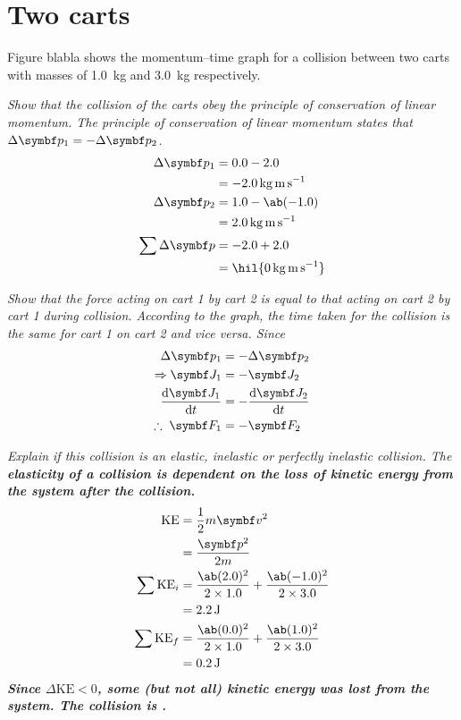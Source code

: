 \section{Two carts}
Figure blabla shows the momentum--time graph for a collision between
two carts with masses of \qty{1.0}{\kg}
and \qty{3.0}{\kg} respectively.

\it{Show that the collision of the carts obey the principle of
conservation of linear momentum.}
The principle of conservation of linear momentum states that
\(\Delta\mv{p}_1 = -\Delta\mv{p}_2\).
\begin{align*}
  \Delta\mv{p}_1 &= 0.0 - 2.0 \\
  &= \qty{-2.0}{\kg\m\per\second} \\
  \Delta\mv{p}_2 &= 1.0 - \ab(-1.0) \\
  &= \qty{2.0}{\kg\m\per\second} \\
  \sum\Delta\mv{p} &= -2.0 + 2.0 \\
  &= \hil{\qty{0}{\kg\m\per\second}}
\end{align*}

\it{Show that the force acting on cart 1 by cart 2 is equal to that
acting on cart 2 by cart 1 during collision.}
According to the graph, the time taken for the collision is the same
for cart 1 on cart 2
and vice versa. Since
\begin{align*}
  \Delta\mv{p}_1 &= -\Delta\mv{p}_2 \\
  \Rightarrow \mv{J}_1 &= -\mv{J}_2 \\
  \odv{\mv{J}_1}{t} &= -\odv{\mv{J}_2}{t} \\
  \therefore\; \mv{F}_1 &= -\mv{F}_2
\end{align*}

\it{Explain if this collision is an elastic, inelastic or perfectly
inelastic collision.}
The \bf{elasticity} of a collision is dependent on the loss of kinetic energy
from the system after the collision.
\begin{align*}
  \text{KE} &= \f{1}{2}m\mv{v}^2 \\
  &= \f{\mv{p}^2}{2m} \\
  \sum \text{KE}_i &= \f{\ab(2.0)^2}{2\times 1.0} +
  \f{\ab(-1.0)^2}{2\times 3.0} \\
  &= \qty{2.2}{\joule} \\
  \sum \text{KE}_f &= \f{\ab(0.0)^2}{2\times 1.0} +
  \f{\ab(1.0)^2}{2\times 3.0} \\
  &= \qty{0.2}{\joule}
\end{align*}
Since \(\Delta\text{KE} < 0\), some (but not all) kinetic energy was
lost from the system. The collision is .

